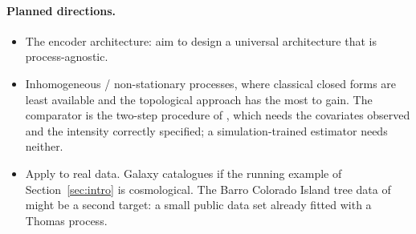 \documentclass[11pt,a4paper]{article}
\begin{document}
\paragraph{Planned directions.}
\begin{itemize}[leftmargin=*,itemsep=2pt]
    \item The encoder architecture: aim to design a universal architecture that
    is process-agnostic.
    \item Inhomogeneous / non-stationary processes, where classical closed forms
    are least available and the topological approach has the most to gain. The
    comparator is the two-step procedure of \citet{waagepetersen2009twostep},
    which needs the covariates observed and the intensity correctly specified; a
    simulation-trained estimator needs neither.
    \item Apply to real data. Galaxy catalogues if the running example of
    Section~\ref{sec:intro} is cosmological. The Barro Colorado Island tree data
    of \citet{waagepetersen2009twostep} might be a second target: a small public
    data set already fitted with a Thomas process.
\end{itemize}
\end{document}
